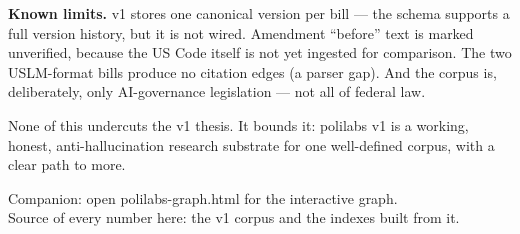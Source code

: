 \documentclass[11pt]{article}
\newcommand{\code}[1]{{\ttfamily\small #1}}
\newcommand{\sectionrule}{\vspace{-0.6em}{\color{rule}\hrule height 1pt}\vspace{0.4em}}
\begin{document}
\textbf{Known limits.} v1 stores one canonical version per bill --- the schema
supports a full version history, but it is not wired. Amendment ``before''
text is marked unverified, because the US Code itself is not yet ingested for
comparison. The two USLM-format bills produce no citation edges (a parser gap).
And the corpus is, deliberately, only AI-governance legislation --- not all of
federal law.

None of this undercuts the v1 thesis. It bounds it: polilabs v1 is a working,
honest, anti-hallucination research substrate for one well-defined corpus, with
a clear path to more.

\vspace{0.6cm}
\sectionrule
\begin{center}\small\color{ink2}
Companion: open \code{polilabs-graph.html} for the interactive graph.\\
Source of every number here: the v1 corpus and the indexes built from it.
\end{center}
\end{document}
